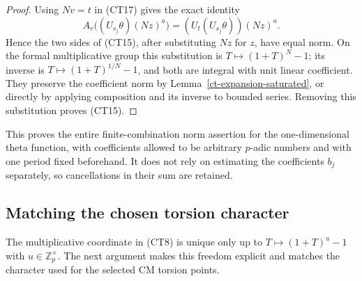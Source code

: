 \begin{proof}
Using $Nv=t$ in (CT17) gives the exact identity
\[
 A_v\bigl((U_{s_j}\theta)(Nz)^a\bigr)
                         =(U_t(U_{s_j}\theta))(Nz)^a.
 \tag{CT18}
\]
Hence the two sides of (CT15), after substituting $Nz$ for $z$,
have equal norm.  On the formal multiplicative group this
substitution is $T\mapsto(1+T)^N-1$; its inverse is
$T\mapsto(1+T)^{1/N}-1$, and both are integral with unit
linear coefficient.  They preserve the coefficient norm by
Lemma~\ref{ct-expansion-saturated}, or directly by applying
composition and its inverse to bounded series.  Removing this
substitution proves (CT15).
\end{proof}

This proves the entire finite-combination norm assertion for the
one-dimensional theta function, with coefficients allowed to be
arbitrary $p$-adic numbers and with one period fixed beforehand.
It does not rely on estimating the coefficients $b_j$ separately,
so cancellations in their sum are retained.

\subsection{Matching the chosen torsion character}

The multiplicative coordinate in (CT8) is unique only up to
$T\mapsto(1+T)^u-1$ with $u\in\mathbb Z_p^\times$.
The next argument makes this freedom explicit and matches the
character used for the selected CM torsion points.

